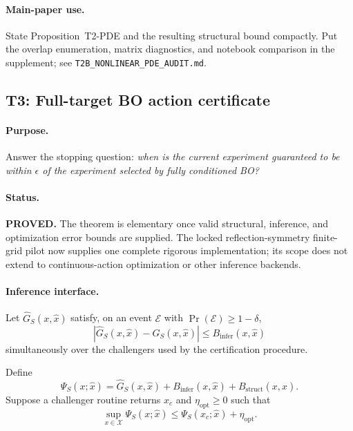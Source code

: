 \paragraph{Main-paper use.}
State Proposition~T2-PDE and the resulting structural bound compactly.  Put
the overlap enumeration, matrix diagnostics, and notebook comparison in the
supplement; see \texttt{T2B\_NONLINEAR\_PDE\_AUDIT.md}.

\subsection{T3: Full-target BO action certificate}

\paragraph{Purpose.}
Answer the stopping question: \emph{when is the current experiment guaranteed to
be within $\epsilon$ of the experiment selected by fully conditioned BO?}

\paragraph{Status.}
\textbf{PROVED.}  The theorem is elementary once valid structural, inference,
and optimization error bounds are supplied.  The locked reflection-symmetry
finite-grid pilot now supplies one complete rigorous implementation; its scope
does not extend to continuous-action optimization or other inference backends.

\paragraph{Inference interface.}
Let $\widehat G_S(x,\widehat x)$ satisfy, on an event $\mathcal E$ with
$\Pr(\mathcal E)\ge1-\delta$,
\begin{equation}
    |\widehat G_S(x,\widehat x)-G_S(x,\widehat x)|
    \le B_{\mathrm{infer}}(x,\widehat x)
    \label{eq:T3-infer}
\end{equation}
simultaneously over the challengers used by the certification procedure.

Define
\begin{equation}
    \Psi_S(x;\widehat x)
    = \widehat G_S(x,\widehat x)
      +B_{\mathrm{infer}}(x,\widehat x)
      +B_{\mathrm{struct}}(x,\widehat x).
    \label{eq:T3-Psi}
\end{equation}
Suppose a challenger routine returns $x_c$ and $\eta_{\mathrm{opt}}\ge0$ such
that
\begin{equation}
    \sup_{x\in\mathcal X}\Psi_S(x;\widehat x)
    \le
    \Psi_S(x_c;\widehat x)+\eta_{\mathrm{opt}}.
    \label{eq:T3-opt}
\end{equation}

